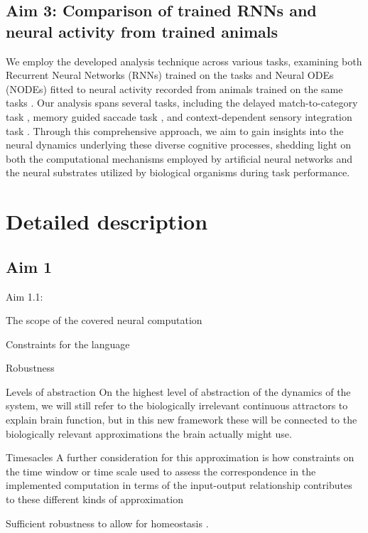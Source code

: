 \documentclass[12pt,letterpaper, onecolumn]{article}
\theoremstyle{definition}
\theoremstyle{remark}
\begin{document}
\subsection*{Aim 3: Comparison of trained RNNs and neural activity from trained animals}
We employ the developed analysis technique across various tasks, examining both Recurrent Neural Networks (RNNs) trained on the tasks and Neural ODEs (NODEs) fitted to neural activity recorded from animals trained on the same tasks \citep{zhao2016, pandarinath2018inferring, kim2021inferring}.
 Our analysis spans several tasks, including the delayed match-to-category task \citep{chaisangmongkon2017computing},
 memory guided saccade task \citep{wimmer2014},
  and context-dependent sensory integration task \citep{mante2013context}.
   Through this comprehensive approach, we aim to gain insights into the neural dynamics underlying these diverse cognitive processes, shedding light on both the computational mechanisms employed by artificial neural networks and the neural substrates utilized by biological organisms during task performance.

%

\newpage
\section{Detailed description}
\subsection*{Aim 1}

Aim 1.1: 

The scope of the covered neural computation

Constraints for the language


Robustness

Levels of abstraction
On the highest level of abstraction of the dynamics of the system, we will still refer to the biologically irrelevant continuous attractors to explain brain function, but in this new framework these will be connected to the biologically relevant approximations the brain actually might use.


Timesacles
 A further consideration for this approximation is how constraints on the time window or time scale used to assess the correspondence in the implemented computation in terms of the input-output relationship contributes to these different kinds of approximation

Sufficient robustness to allow for homeostasis \citep{oleary2018homeostasis, niemeyer2021}.
\end{document}
